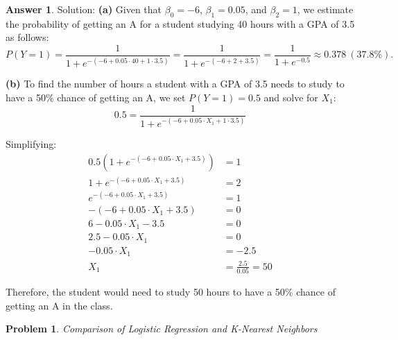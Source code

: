 \documentclass[12pt]{article}
\newtheorem{problem}{Problem} %
\theoremstyle{definition}
\newtheorem*{answer}{Answer}
\newcommand{\solution}{\textcolor{PineGreen}{Solution:\newline}}
\begin{document}
\begin{answer}
\solution
\textbf{(a)} Given that \(\beta_0 = -6\), \(\beta_1 = 0.05\), and \(\beta_2 = 1\), we estimate the probability of getting an A for a student studying 40 hours with a GPA of 3.5 as follows:
\[
    P(Y=1) 
    = \frac{1}{1 + e^{-(-6 + 0.05 \cdot 40 + 1 \cdot 3.5)}} 
    = \frac{1}{1 + e^{-(-6 + 2 + 3.5)}} 
    = \frac{1}{1 + e^{-0.5}} 
    \approx 0.378 \ (\text{37.8\%}).
\]

\textbf{(b)} To find the number of hours a student with a GPA of 3.5 needs to study to have a 50\% chance of getting an A, we set $P(Y=1) = 0.5$ and solve for $X_1$:
\[
0.5 = \frac{1}{1 + e^{-(-6 + 0.05 \cdot X_1 + 1 \cdot 3.5)}}
\]

Simplifying:
\[
\begin{aligned}
0.5(1 + e^{-(-6 + 0.05 \cdot X_1 + 3.5)}) &= 1 \\
1 + e^{-(-6 + 0.05 \cdot X_1 + 3.5)} &= 2 \\
e^{-(-6 + 0.05 \cdot X_1 + 3.5)} &= 1 \\
-(-6 + 0.05 \cdot X_1 + 3.5) &= 0 \\
6 - 0.05 \cdot X_1 - 3.5 &= 0 \\
2.5 - 0.05 \cdot X_1 &= 0 \\
-0.05 \cdot X_1 &= -2.5 \\
X_1 &= \frac{2.5}{0.05} = 50
\end{aligned}
\]

Therefore, the student would need to study 50 hours to have a 50\% chance of getting an A in the class.
\end{answer}

\setcounter{problem}{7}
\begin{problem}
\textbf{} Comparison of Logistic Regression and K-Nearest Neighbors
\end{problem}
\end{document}
